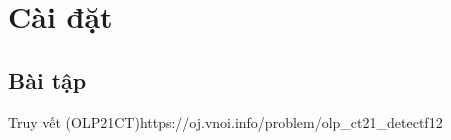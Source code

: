 \chapter{Cài đặt}

\minitoc

\section{Bài tập}

\begin{baitap}{Truy vết (OLP21CT)}{https://oj.vnoi.info/problem/olp\_ct21\_detectf12}

\end{baitap}

